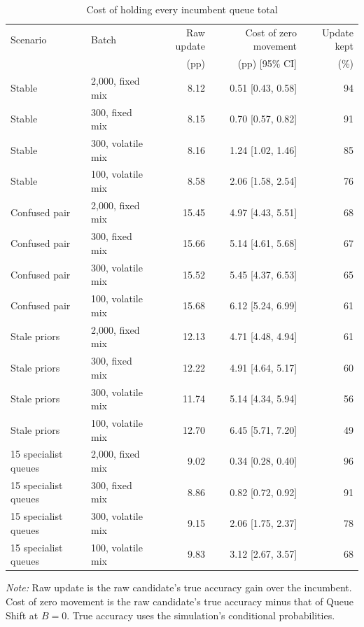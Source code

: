 \begin{table}[H]
\centering
\caption{Cost of holding every incumbent queue total}
\label{tab:lock-cost}
\scriptsize
\begin{tabular}{llrrr}
\toprule
Scenario & Batch & Raw update & Cost of zero movement & Update kept \\
 & & (pp) & (pp) [95\% CI] & (\%) \\
\midrule
Stable & 2,000, fixed mix & 8.12 & 0.51 [0.43, 0.58] & 94 \\
Stable & 300, fixed mix & 8.15 & 0.70 [0.57, 0.82] & 91 \\
Stable & 300, volatile mix & 8.16 & 1.24 [1.02, 1.46] & 85 \\
Stable & 100, volatile mix & 8.58 & 2.06 [1.58, 2.54] & 76 \\
Confused pair & 2,000, fixed mix & 15.45 & 4.97 [4.43, 5.51] & 68 \\
Confused pair & 300, fixed mix & 15.66 & 5.14 [4.61, 5.68] & 67 \\
Confused pair & 300, volatile mix & 15.52 & 5.45 [4.37, 6.53] & 65 \\
Confused pair & 100, volatile mix & 15.68 & 6.12 [5.24, 6.99] & 61 \\
Stale priors & 2,000, fixed mix & 12.13 & 4.71 [4.48, 4.94] & 61 \\
Stale priors & 300, fixed mix & 12.22 & 4.91 [4.64, 5.17] & 60 \\
Stale priors & 300, volatile mix & 11.74 & 5.14 [4.34, 5.94] & 56 \\
Stale priors & 100, volatile mix & 12.70 & 6.45 [5.71, 7.20] & 49 \\
15 specialist queues & 2,000, fixed mix & 9.02 & 0.34 [0.28, 0.40] & 96 \\
15 specialist queues & 300, fixed mix & 8.86 & 0.82 [0.72, 0.92] & 91 \\
15 specialist queues & 300, volatile mix & 9.15 & 2.06 [1.75, 2.37] & 78 \\
15 specialist queues & 100, volatile mix & 9.83 & 3.12 [2.67, 3.57] & 68 \\
\bottomrule
\end{tabular}
\begin{minipage}{0.96\linewidth}
\footnotesize\emph{Note:} Raw update is the raw candidate's true accuracy gain over the incumbent. Cost of zero movement is the raw candidate's true accuracy minus that of Queue Shift at $B=0$. True accuracy uses the simulation's conditional probabilities.
\end{minipage}
\end{table}
